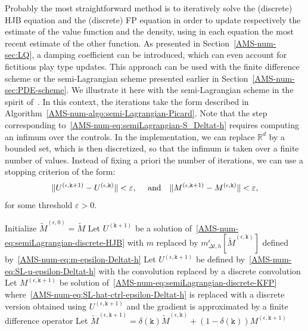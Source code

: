 \documentclass{amsproc}
\theoremstyle{definition}
\theoremstyle{remark}
\numberwithin{equation}{section}
\newcommand{\RR}{{\mathbb R}}
\begin{document}
Probably the most straightforward method is to iteratively solve the (discrete) HJB equation and the (discrete) FP equation in order to update respectively the estimate of the value function and the density, using in each equation the most recent estimate of the other function. As presented in Section~\ref{AMS-num-sec:LQ}, a damping coefficient can be introduced, which can even account for fictitious play type updates.  
This approach can be used with the finite difference scheme or the semi-Lagrangian scheme presented earlier in Section~\ref{AMS-num-sec:PDE-scheme}. We illustrate it here with the semi-Lagrangian scheme in the spirit of~\cite{MR3148086}. In this context, the iterations take the form described in Algorithm~\ref{AMS-num-algo:semi-Lagrangian-Picard}. Note that the step corresponding to~\eqref{AMS-num-eq:semiLagrangian-S_Deltat-h} requires computing an infimum over the controls. In the implementation, we can replace $\RR^d$ by a bounded set, which is then discretized, so that the infimum is taken over a finite number of values. Instead of fixing a priori the number of iterations, we can use a stopping criterion of the form:
$$
	\|U^{(\epsilon, \mathtt{k}+1)} - U^{(\epsilon, \mathtt{k})}\| < \varepsilon, \quad \hbox{ and}  \quad \|M^{(\epsilon, \mathtt{k}+1)} - M^{(\epsilon, \mathtt{k})}\| < \varepsilon,
$$
for some threshold $\varepsilon>0$.


\begin{algorithm}[H]
\DontPrintSemicolon
  
  Initialize $\tilde{M}^{(\epsilon, 0)} = \tilde M$ \;
        { 
        	Let $U^{(\mathtt{k}+1)}$ be a solution of~\eqref{AMS-num-eq:semiLagrangian-discrete-HJB} with $m$ replaced by $m^{\epsilon}_{\Delta t, h}[\tilde{M}^{(\epsilon, \mathtt{k})}]$ defined by~\eqref{AMS-num-eq:m-epsilon-Deltat-h}\;
	Let $U^{(\epsilon, \mathtt{k}+1)}$ be defined by~\eqref{AMS-num-eq:SL-u-epsilon-Deltat-h} with the convolution replaced by a discrete convolution\;
	Let $M^{(\epsilon, \mathtt{k}+1)}$ be solution of~\eqref{AMS-num-eq:semiLagrangian-discrete-KFP} where~\eqref{AMS-num-eq:SL-hat-ctrl-epsilon-Deltat-h} is replaced with a discrete version obtained using $U^{(\epsilon, \mathtt{k}+1)}$ and the gradient is approximated by a finite difference operator \;
	Let $\tilde{M}^{(\epsilon, \mathtt{k}+1)} = \delta(\mathtt{k}) \tilde{M}^{(\epsilon, \mathtt{k})} + (1-\delta(\mathtt{k})) M^{(\epsilon, \mathtt{k}+1)}$\;
	}
\caption{Fixed-point iterations with semi-Lagrangian scheme \label{AMS-num-algo:semi-Lagrangian-Picard}}
\end{algorithm}
\end{document}
